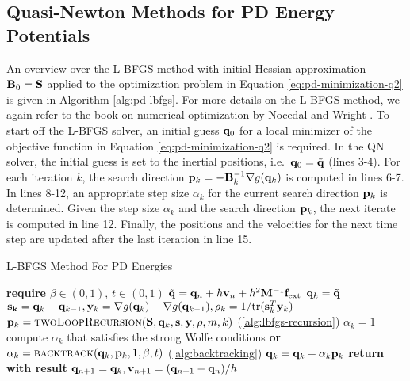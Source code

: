 \subsection{Quasi-Newton Methods for PD Energy Potentials}\label{ss:qn-pd}
An overview over the L-BFGS method with initial Hessian approximation $\mathbf{B}_0 = \mathbf{S}$ applied to the optimization problem in Equation 
\ref{eq:pd-minimization-q2} is given in Algorithm \ref{alg:pd-lbfgs}. For more details on the L-BFGS method, we again refer to the book 
on numerical optimization by Nocedal and Wright \cite{nocedal2006}. To start off the L-BFGS solver, an initial guess $\mathbf{q}_0$ for a local 
minimizer of the objective function in Equation \ref{eq:pd-minimization-q2} is required. In the QN solver, the initial guess is set to the 
inertial positions, i.e.\ $\mathbf{q}_0 = \tilde{\mathbf{q}}$ (lines 3-4). For each iteration $k$, the search direction $\mathbf{p}_k = 
-\mathbf{B}_k^{-1}\nabla g(\mathbf{q}_k)$ is computed in lines 6-7. In lines 8-12, an appropriate step size $\alpha_k$ for the current search 
direction $\mathbf{p}_k$ is determined. Given the step size $\alpha_k$ and the search direction $\mathbf{p}_k$, the next iterate 
is computed in line 12. Finally, the positions and the velocities for the next time step are updated after the last iteration in line 15.

\begin{algorithm}[t]
\caption{L-BFGS Method For PD Energies}\label{alg:pd-lbfgs}
\begin{algorithmic}[1]
\State \textbf{require } $\beta \in (0, 1)$, $t \in (0, 1)$
\State $\tilde{\mathbf{q}} = \mathbf{q}_n + h\mathbf{v}_n + h^2\mathbf{M}^{-1}\mathbf{f}_{\text{ext}}$
\State $\mathbf{q}_k = \tilde{\mathbf{q}}$
\State $\mathbf{s_k} = \mathbf{q}_k - \mathbf{q}_{k-1}, \mathbf{y}_k = \nabla g(\mathbf{q}_k) - \nabla g(\mathbf{q}_{k-1}), \rho_k = 1 / \text{tr}(\mathbf{s}^T_k \mathbf{y}_k)$
\State $\mathbf{p}_k = \text{\textsc{twoLoopRecursion}}(\mathbf{S}, \mathbf{q}_k, \mathbf{s}, \mathbf{y}, \rho, m, k)$   (\cref{alg:lbfgs-recursion})
\State $\alpha_k = 1$
\State compute $\alpha_k$ that satisfies the strong Wolfe conditions 
\State \textbf{or} $\alpha_k = \text{\textsc{backtrack}}(\mathbf{q}_k, \mathbf{p}_k, 1, \beta, t)$ (\cref{alg:backtracking})
\EndIf
\State $\mathbf{q}_k = \mathbf{q}_k + \alpha_k \mathbf{p}_k$
\EndFor
\State \textbf{return with result } $\mathbf{q}_{n+1} = \mathbf{q}_k, \mathbf{v}_{n+1} = (\mathbf{q}_{n+1} - \mathbf{q}_n)/h$
\EndProcedure
\end{algorithmic}
\end{algorithm}

